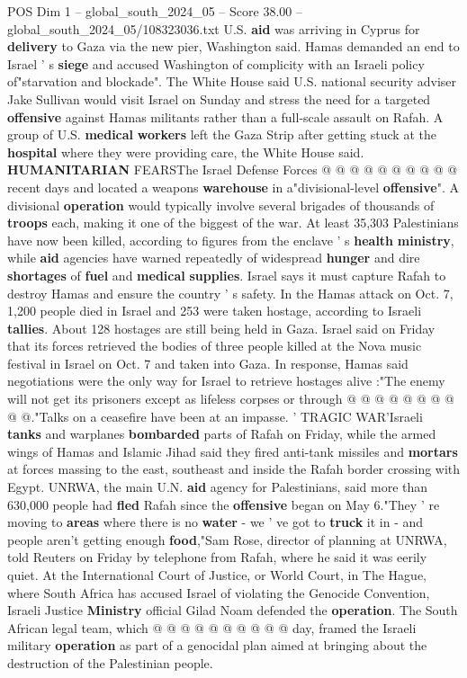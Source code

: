 \begin{textsample}{POS Dim 1 – global\_south\_2024\_05 – Score 38.00 – global\_south\_2024\_05/108323036.txt}
U.S. \textbf{aid} was arriving in Cyprus for \textbf{delivery} to Gaza via the new pier, Washington said.
Hamas demanded an end to Israel ' s \textbf{siege} and accused Washington of complicity with an Israeli policy of"starvation and blockade".
The White House said U.S. national security adviser Jake Sullivan would visit Israel on Sunday and stress the need for a targeted \textbf{offensive} against Hamas militants rather than a full-scale assault on Rafah.
A group of U.S. \textbf{medical} \textbf{workers} left the Gaza Strip after getting stuck at the \textbf{hospital} where they were providing care, the White House said. \textbf{HUMANITARIAN} FEARSThe Israel Defense Forces @ @ @ @ @ @ @ @ @ @ recent days and located a weapons \textbf{warehouse} in a"divisional-level \textbf{offensive}".
A divisional \textbf{operation} would typically involve several brigades of thousands of \textbf{troops} each, making it one of the biggest of the war.
At least 35,303 Palestinians have now been killed, according to figures from the enclave ' s \textbf{health} \textbf{ministry}, while \textbf{aid} agencies have warned repeatedly of widespread \textbf{hunger} and dire \textbf{shortages} of \textbf{fuel} and \textbf{medical} \textbf{supplies}.
Israel says it must capture Rafah to destroy Hamas and ensure the country ' s safety.
In the Hamas attack on Oct. 7, 1,200 people died in Israel and 253 were taken hostage, according to Israeli \textbf{tallies}.
About 128 hostages are still being held in Gaza.
Israel said on Friday that its forces retrieved the bodies of three people killed at the Nova music festival in Israel on Oct. 7 and taken into Gaza.
In response, Hamas said negotiations were the only way for Israel to retrieve hostages alive :"The enemy will not get its prisoners except as lifeless corpses or through @ @ @ @ @ @ @ @ @ @."Talks on a ceasefire have been at an impasse. ' TRAGIC WAR'Israeli \textbf{tanks} and warplanes \textbf{bombarded} parts of Rafah on Friday, while the armed wings of Hamas and Islamic Jihad said they fired anti-tank missiles and \textbf{mortars} at forces massing to the east, southeast and inside the Rafah border crossing with Egypt.
UNRWA, the main U.N. \textbf{aid} agency for Palestinians, said more than 630,000 people had \textbf{fled} Rafah since the \textbf{offensive} began on May 6."They ' re moving to \textbf{areas} where there is no \textbf{water} - we ' ve got to \textbf{truck} it in - and people aren't getting enough \textbf{food},"Sam Rose, director of planning at UNRWA, told Reuters on Friday by telephone from Rafah, where he said it was eerily quiet.
At the International Court of Justice, or World Court, in The Hague, where South Africa has accused Israel of violating the Genocide Convention, Israeli Justice \textbf{Ministry} official Gilad Noam defended the \textbf{operation}.
The South African legal team, which @ @ @ @ @ @ @ @ @ @ day, framed the Israeli military \textbf{operation} as part of a genocidal plan aimed at bringing about the destruction of the Palestinian people.


\end{textsample}
